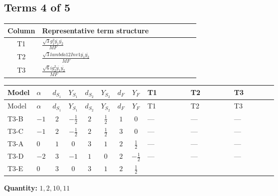 \documentclass[8pt]{article}
\begin{document}
\begin{landscape}
\subsection*{Terms 4 of 5}
\begin{center}
\begin{tabular}{@{}c >{\raggedright\arraybackslash}p{0.82\linewidth}@{}}
\toprule
Column & Representative term structure \\
\midrule
T1 & \(\displaystyle \frac{\sqrt{3} g_{1}^{2} \overline{y_{1}} \overline{y_{2}}}{MF}\) \\
\midrule
T2 & \(\displaystyle \frac{\sqrt{3} lambda12Inv1 \overline{y_{1}} \overline{y_{2}}}{MF}\) \\
\midrule
T3 & \(\displaystyle \frac{\sqrt{6} i g_{2}^{2} \overline{y_{1}} \overline{y_{2}}}{MF}\) \\
\midrule
\bottomrule
\end{tabular}
\end{center}
\smallskip
\tiny
\begin{longtable}{@{}llcccccc >{\raggedright\arraybackslash}p{0.21\linewidth} >{\raggedright\arraybackslash}p{0.21\linewidth} >{\raggedright\arraybackslash}p{0.21\linewidth}@{}}
\toprule
Model & $\alpha$ & $d_{S_1}$ & $Y_{S_1}$ & $d_{S_2}$ & $Y_{S_2}$ & $d_F$ & $Y_F$ & T1 & T2 & T3 \\
\midrule
\endfirsthead
\toprule
Model & $\alpha$ & $d_{S_1}$ & $Y_{S_1}$ & $d_{S_2}$ & $Y_{S_2}$ & $d_F$ & $Y_F$ & T1 & T2 & T3 \\
\midrule
\endhead
T3-B & $-1$ & $2$ & $-\frac{1}{2}$ & $2$ & $\frac{1}{2}$ & $1$ & $0$ & --- & --- & --- \\
\midrule
T3-C & $-1$ & $2$ & $-\frac{1}{2}$ & $2$ & $\frac{1}{2}$ & $3$ & $0$ & --- & --- & --- \\
\midrule
T3-A & $0$ & $1$ & $0$ & $3$ & $1$ & $2$ & $\frac{1}{2}$ & --- & --- & --- \\
\midrule
T3-D & $-2$ & $3$ & $-1$ & $1$ & $0$ & $2$ & $-\frac{1}{2}$ & --- & --- & --- \\
\midrule
T3-E & $0$ & $3$ & $0$ & $3$ & $1$ & $2$ & $\frac{1}{2}$ & \scriptsize\adjustbox{max width=\linewidth}{$\begin{gathered} - \frac{\sqrt{3} g_{1}^{2} \overline{y_{1}} \overline{y_{2}}}{8 MF}\end{gathered}$} & \scriptsize\adjustbox{max width=\linewidth}{$\begin{gathered} \frac{\sqrt{3} lambda12Inv1 \overline{y_{1}} \overline{y_{2}}}{6 MF}\end{gathered}$} & \scriptsize\adjustbox{max width=\linewidth}{$\begin{gathered} \frac{\sqrt{6} i g_{2}^{2} \overline{y_{1}} \overline{y_{2}}}{6 MF}\end{gathered}$} \\
\midrule
\bottomrule
\end{longtable}
\clearpage
\noindent\textbf{Quantity: }$\mathrm{1,2,10,11}$\par\smallskip

\end{landscape}
\end{document}
